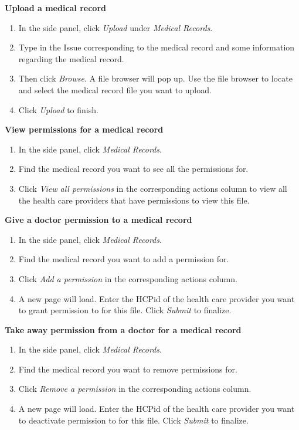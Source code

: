 \documentclass[12pt]{report}
\begin{document}
\textbf{Upload a medical record}
\begin{enumerate}
\item In the side panel, click \textit{Upload} under \textit{Medical Records}.
\item Type in the Issue corresponding to the medical record and some information regarding the medical record.
\item Then click \textit{Browse}. A file browser will pop up. Use the file browser to locate and select the medical record file you want to upload.
\item Click \textit{Upload} to finish.
\end{enumerate}
\textbf{View permissions for a medical record}
\begin{enumerate}
\item In the side panel, click \textit{Medical Records}.
\item Find the medical record you want to see all the permissions for.
\item Click \textit{View all permissions} in the corresponding actions column to view all the health care providers that have permissions to view this file.
\end{enumerate}
\textbf{Give a doctor permission to a medical record}
\begin{enumerate}
\item In the side panel, click \textit{Medical Records}.
\item Find the medical record you want to add a permission for.
\item Click \textit{Add a permission} in the corresponding actions column.
\item A new page will load. Enter the HCPid of the health care provider you want to grant permission to for this file. Click \textit{Submit} to finalize.
\end{enumerate}
\textbf{Take away permission from a doctor for a medical record}
\begin{enumerate}
\item In the side panel, click \textit{Medical Records}.
\item Find the medical record you want to remove permissions for.
\item Click \textit{Remove a permission} in the corresponding actions column.
\item A new page will load. Enter the HCPid of the health care provider you want to deactivate permission to for this file. Click \textit{Submit} to finalize.
\end{enumerate}
\end{document}
